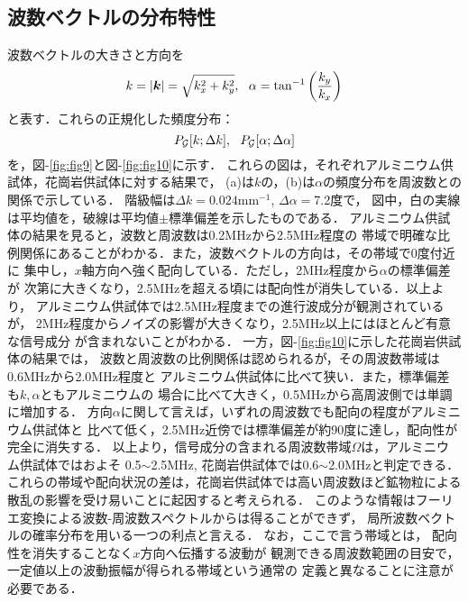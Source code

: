 \subsection{波数ベクトルの分布特性}
波数ベクトルの大きさと方向を
\begin{equation}
	k=\left| \fat{k} \right|=\sqrt{k_x^2+k_y^2},  \ \ 
	\alpha = \tan^{-1} \left( \frac{k_y}{k_x} \right)
	\label{eqn:kpol}
\end{equation}
と表す．これらの正規化した頻度分布：
\[
	P_{\cal G}[k;\Delta k], \ \ 
	P_{\cal G}[\alpha;\Delta \alpha]
\]
を，図-\ref{fig:fig9}と図-\ref{fig:fig10}に示す．
これらの図は，それぞれアルミニウム供試体，花崗岩供試体に対する結果で，
(a)は$k$の，(b)は$\alpha$の頻度分布を周波数との関係で示している．
階級幅は$\Delta k=0.024$mm$^{-1}$, $\Delta \alpha=$7.2度で，
図中，白の実線は平均値を，破線は平均値$\pm$標準偏差を示したものである．
アルミニウム供試体の結果を見ると，波数と周波数は0.2MHzから2.5MHz程度の
帯域で明確な比例関係にあることがわかる．また，波数ベクトルの方向は，その帯域で0度付近に
集中し，$x$軸方向へ強く配向している．ただし，2MHz程度から$\alpha$の標準偏差が
次第に大きくなり，2.5MHzを超える頃には配向性が消失している．以上より，
アルミニウム供試体では2.5MHz程度までの進行波成分が観測されているが，
2MHz程度からノイズの影響が大きくなり，2.5MHz以上にはほとんど有意な信号成分
が含まれないことがわかる．
一方，図-\ref{fig:fig10}に示した花崗岩供試体の結果では，
波数と周波数の比例関係は認められるが，その周波数帯域は0.6MHzから2.0MHz程度と
アルミニウム供試体に比べて狭い．また，標準偏差も$k,\alpha$ともアルミニウムの
場合に比べて大きく，0.5MHzから高周波側では単調に増加する．
方向$\alpha$に関して言えば，いずれの周波数でも配向の程度がアルミニウム供試体と
比べて低く，2.5MHz近傍では標準偏差が約90度に達し，配向性が完全に消失する．
以上より，信号成分の含まれる周波数帯域$\Omega$は，アルミニウム供試体ではおよそ
0.5$\sim$2.5MHz, 花崗岩供試体では0.6$\sim$2.0MHzと判定できる．
これらの帯域や配向状況の差は，花崗岩供試体では高い周波数ほど鉱物粒による
散乱の影響を受け易いことに起因すると考えられる．
%
このような情報はフーリエ変換による波数-周波数スペクトルからは得ることができず，
局所波数ベクトルの確率分布を用いる一つの利点と言える．
なお，ここで言う帯域とは， 配向性を消失することなく$x$方向へ伝播する波動が
観測できる周波数範囲の目安で，一定値以上の波動振幅が得られる帯域という通常の
定義と異なることに注意が必要である．
